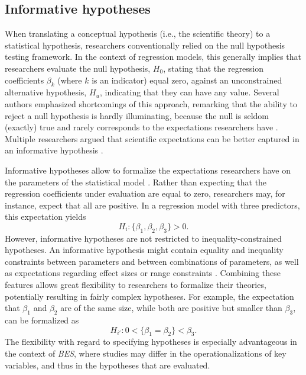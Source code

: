 \documentclass[review, 3p, authoryear]{elsarticle} %
\begin{document}
\hypertarget{informative-hypotheses}{%
\subsection{Informative hypotheses}\label{informative-hypotheses}}

When translating a conceptual hypothesis (i.e., the scientific theory) to a statistical hypothesis, researchers conventionally relied on the null hypothesis testing framework.
In the context of regression models, this generally implies that researchers evaluate the null hypothesis, \(H_0\), stating that the regression coefficients \(\beta_k\) (where \(k\) is an indicator) equal zero, against an unconstrained alternative hypothesis, \(H_u\), indicating that they can have any value.
Several authors emphasized shortcomings of this approach, remarking that the ability to reject a null hypothesis is hardly illuminating, because the null is seldom (exactly) true \citep{cohen_earth_1994, lykken_wrong_1991} and rarely corresponds to the expectations researchers have \citep{cohen_things_i_learned_1990, vandeschoot_informative_2011, royall1997statistical, trafimow_manipulating_2018}.
Multiple researchers argued that scientific expectations can be better captured in an informative hypothesis \citep{hoijtink_informative_2012, vandeschoot_informative_2011}.

Informative hypotheses allow to formalize the expectations researchers have on the parameters of the statistical model \citep{hoijtink_informative_2012}.
Rather than expecting that the regression coefficients under evaluation are equal to zero, researchers may, for instance, expect that all are positive.
In a regression model with three predictors, this expectation yields
\[
H_i: \{\beta_1, \beta_2, \beta_3\} > 0.
\]
However, informative hypotheses are not restricted to inequality-constrained hypotheses.
An informative hypothesis might contain equality and inequality constraints between parameters and between combinations of parameters, as well as expectations regarding effect sizes or range constraints \citep{hoijtink2019tutorial}.
Combining these features allows great flexibility to researchers to formalize their theories, potentially resulting in fairly complex hypotheses.
For example, the expectation that \(\beta_1\) and \(\beta_2\) are of the same size, while both are positive but smaller than \(\beta_3\), can be formalized as
\[
H_{i'}: 0 < \{\beta_1=\beta_2\} < \beta_3. 
\]
The flexibility with regard to specifying hypotheses is especially advantageous in the context of \emph{BES}, where studies may differ in the operationalizations of key variables, and thus in the hypotheses that are evaluated.
\end{document}

